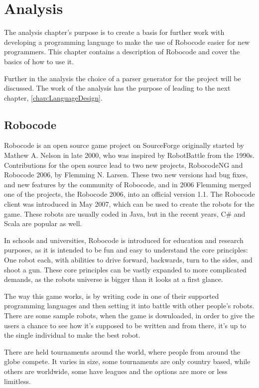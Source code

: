 \chapter{Analysis}
\label{chap:Analysis}
The analysis chapter’s purpose is to create a basis for further work with developing a programming language to make the use of Robocode easier for new programmers. This chapter contains a description of Robocode and cover the basics of how to use it. 

Further in the analysis the choice of a parser generator for the project will be discussed. The work of the analysis has the purpose of leading to the next chapter, \ref{chap:LanguageDesign}.

\section{Robocode}
\label{sec:Robocode}
Robocode is an open source game project on SourceForge originally started by Mathew A. Nelson in late 2000, who was inspired by RobotBattle from the 1990s. Contributions for the open source lead to two new projects, RobocodeNG and Robocode 2006, by Flemming N. Larsen. These two new versions had bug fixes, and new features by the community of Robocode, and in 2006 Flemming merged one of the projects, the Robocode 2006, into an official version 1.1.
The Robocode client was introduced in May 2007, which can be used to create the robots for the game. These robots are usually coded in Java, but in the recent years, C\# and Scala are popular as well. \citep{robocode}

In schools and universities, Robocode is introduced for education and research purposes, as it is intended to be fun and easy to understand the core principles: One robot each, with abilities to drive forward, backwards, turn to the sides, and shoot a gun. These core principles can be vastly expanded to more complicated demands, as the robots universe is bigger than it looks at a first glance. \citep{RoboReadMe}

The way this game works, is by writing code in one of their supported programming languages and then setting it into battle with other people’s robots. There are some sample robots, when the game is downloaded, in order to give the users a chance to see how it’s supposed to be written and from there, it’s up to the single individual to make the best robot. \citep{MyFirstRobot}

There are held tournaments around the world, where people from around the globe compete. It varies in size, some tournaments are only country based, while others are worldwide, some have leagues and the options are more or less limitless. \citep{rc}

